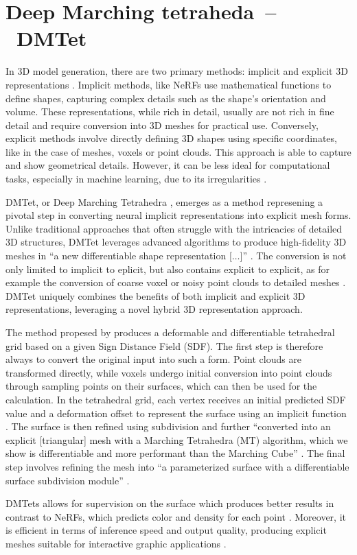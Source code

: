 \section{Deep Marching tetraheda~--~DMTet}\label{DMTet}
In 3D model generation, there are two primary methods: implicit and explicit 3D representations \citep{shen2021DMTet}. Implicit methods, like NeRFs use mathematical functions to define shapes, capturing complex details such as the shape's orientation and volume. These representations, while rich in detail, usually are not rich in fine detail and require conversion into 3D meshes for practical use. Conversely, explicit methods involve directly defining 3D shapes using specific coordinates, like in the case of meshes, voxels or point clouds. This approach is able to capture and show geometrical details. However, it can be less ideal for computational tasks, especially in machine learning, due to its irregularities \citep{michalkiewicz2019deep}.

DMTet, or Deep Marching Tetrahedra \citep{shen2021DMTet},  emerges as a method represening a pivotal step in converting neural implicit representations into explicit mesh forms. Unlike traditional approaches that often struggle with the intricacies of detailed 3D structures, DMTet leverages advanced algorithms to produce high-fidelity 3D meshes in ``a new differentiable shape representation [\(\ldots\)]'' \citep{shen2021DMTet}. The conversion is not only limited to implicit to eplicit, but also contains explicit to explicit, as for example the conversion of coarse voxel or noisy point clouds to detailed meshes \citep{shen2021DMTet}. DMTet uniquely combines the benefits of both implicit and explicit 3D representations, leveraging a novel hybrid 3D representation approach. 

The method propesed by \citeauthor{shen2021DMTet} produces a deformable and differentiable tetrahedral grid based on a given Sign Distance Field (SDF). The first step is therefore always to convert the original input into such a form. Point clouds are transformed directly, while voxels undergo initial conversion into point clouds through sampling points on their surfaces, which can then be used for the calculation. In the tetrahedral grid, each vertex receives an initial predicted SDF value and a deformation offset to represent the surface using an implicit function \citep{shen2021DMTet}. The surface is then refined using subdivision and further ``converted into an explicit [triangular] mesh with a Marching Tetrahedra (MT) algorithm, which we show is differentiable and more performant than the Marching Cube'' \citep{shen2021DMTet}. The final step involves refining the mesh into ``a parameterized surface with a differentiable surface subdivision module'' \citep{shen2021DMTet}.

DMTets allows for supervision on the surface which produces better results in contrast to NeRFs, which predicts color and density for each point \citep{shen2021DMTet}. Moreover, it is efficient in terms of inference speed and output quality, producing explicit meshes suitable for interactive graphic applications \citep{shen2021DMTet}.